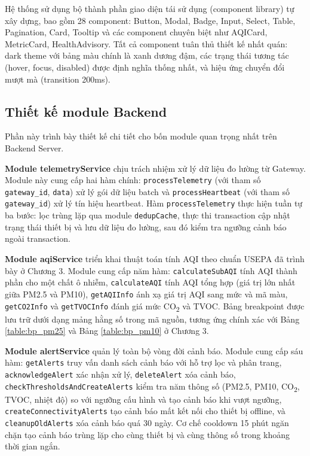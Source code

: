 \documentclass[../DoAn.tex]{subfiles}
\begin{document}
Hệ thống sử dụng bộ thành phần giao diện tái sử dụng (component library) tự xây dựng, bao gồm 28 component: Button, Modal, Badge, Input, Select, Table, Pagination, Card, Tooltip và các component chuyên biệt như AQICard, MetricCard, HealthAdvisory. Tất cả component tuân thủ thiết kế nhất quán: dark theme với bảng màu chính là xanh dương đậm, các trạng thái tương tác (hover, focus, disabled) được định nghĩa thống nhất, và hiệu ứng chuyển đổi mượt mà (transition 200ms).


\subsection{Thiết kế module Backend}
\label{subsection:4.2.4}

Phần này trình bày thiết kế chi tiết cho bốn module quan trọng nhất trên Backend Server.

\textbf{Module telemetryService} chịu trách nhiệm xử lý dữ liệu đo lường từ Gateway. Module này cung cấp hai hàm chính: \texttt{processTelemetry} (với tham số \texttt{gateway\_id}, \texttt{data}) xử lý gói dữ liệu batch và \texttt{processHeartbeat} (với tham số \texttt{gateway\_id}) xử lý tín hiệu heartbeat. Hàm \texttt{processTelemetry} thực hiện tuần tự ba bước: lọc trùng lặp qua module \texttt{dedupCache}, thực thi transaction cập nhật trạng thái thiết bị và lưu dữ liệu đo lường, sau đó kiểm tra ngưỡng cảnh báo ngoài transaction.

\textbf{Module aqiService} triển khai thuật toán tính \gls{AQI} theo chuẩn \gls{USEPA} đã trình bày ở Chương 3. Module cung cấp năm hàm: \texttt{calculateSubAQI} tính AQI thành phần cho một chất ô nhiễm, \texttt{calculateAQI} tính AQI tổng hợp (giá trị lớn nhất giữa PM2.5 và PM10), \texttt{getAQIInfo} ánh xạ giá trị AQI sang mức và mã màu, \texttt{getCO2Info} và \texttt{getTVOCInfo} đánh giá mức CO\textsubscript{2} và TVOC. Bảng breakpoint được lưu trữ dưới dạng mảng hằng số trong mã nguồn, tương ứng chính xác với Bảng \ref{table:bp_pm25} và Bảng \ref{table:bp_pm10} ở Chương 3.

\textbf{Module alertService} quản lý toàn bộ vòng đời cảnh báo. Module cung cấp sáu hàm: \texttt{getAlerts} truy vấn danh sách cảnh báo với hỗ trợ lọc và phân trang, \texttt{acknowledgeAlert} xác nhận xử lý, \texttt{deleteAlert} xóa cảnh báo, \texttt{checkThresholdsAndCreateAlerts} kiểm tra năm thông số (PM2.5, PM10, CO\textsubscript{2}, TVOC, nhiệt độ) so với ngưỡng cấu hình và tạo cảnh báo khi vượt ngưỡng, \texttt{createConnectivityAlerts} tạo cảnh báo mất kết nối cho thiết bị offline, và \texttt{cleanupOldAlerts} xóa cảnh báo quá 30 ngày. Cơ chế cooldown 15 phút ngăn chặn tạo cảnh báo trùng lặp cho cùng thiết bị và cùng thông số trong khoảng thời gian ngắn.
\end{document}
